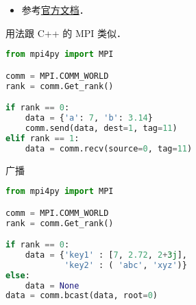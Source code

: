 
\begin{issues}
\issueDraft
\end{issues}

\begin{itemize}
\item 参考\href{https://mpi4py.readthedocs.io/en/stable/}{官方文档}．
\end{itemize}

用法跟 C++ 的 MPI 类似．

\begin{lstlisting}[language=python]
from mpi4py import MPI

comm = MPI.COMM_WORLD
rank = comm.Get_rank()

if rank == 0:
    data = {'a': 7, 'b': 3.14}
    comm.send(data, dest=1, tag=11)
elif rank == 1:
    data = comm.recv(source=0, tag=11)
\end{lstlisting}

广播
\begin{lstlisting}[language=python]
from mpi4py import MPI

comm = MPI.COMM_WORLD
rank = comm.Get_rank()

if rank == 0:
    data = {'key1' : [7, 2.72, 2+3j],
            'key2' : ( 'abc', 'xyz')}
else:
    data = None
data = comm.bcast(data, root=0)
\end{lstlisting}
